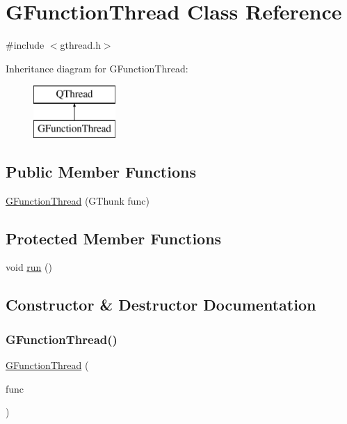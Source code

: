 \hypertarget{classGFunctionThread}{}\section{G\+Function\+Thread Class Reference}
\label{classGFunctionThread}


{\ttfamily \#include $<$gthread.\+h$>$}

Inheritance diagram for G\+Function\+Thread\+:\begin{figure}[H]
\begin{center}
\leavevmode
\includegraphics[height=2.000000cm]{classGFunctionThread}
\end{center}
\end{figure}
\subsection*{Public Member Functions}
\begin{DoxyCompactItemize}
\item 
\mbox{\hyperlink{classGFunctionThread_a8c9d2e1e8e70e27c58074765ac1b3ca9}{G\+Function\+Thread}} (G\+Thunk func)
\end{DoxyCompactItemize}
\subsection*{Protected Member Functions}
\begin{DoxyCompactItemize}
\item 
void \mbox{\hyperlink{classGFunctionThread_a13a43e6d814de94978c515cb084873b1}{run}} ()
\end{DoxyCompactItemize}


\subsection{Constructor \& Destructor Documentation}
\mbox{\label{classGFunctionThread_a8c9d2e1e8e70e27c58074765ac1b3ca9}} 
\subsubsection{\texorpdfstring{G\+Function\+Thread()}{GFunctionThread()}}
{\footnotesize\ttfamily \mbox{\hyperlink{classGFunctionThread}{G\+Function\+Thread}} (\begin{DoxyParamCaption}\item[{G\+Thunk}]{func }\end{DoxyParamCaption})}



